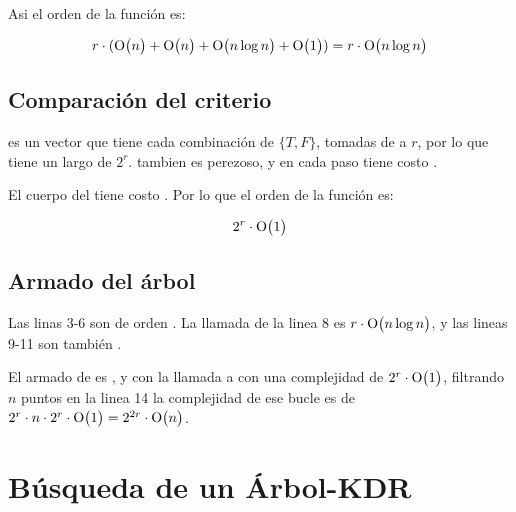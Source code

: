 Asi el orden de la función  es:

\[ r \cdot (\mathrm{O}\bigl(n\bigr)+\mathrm{O}\bigl(n\bigr)+\mathrm{O}\bigl(n \log{n}\bigr) + \mathrm{O}\bigl(1\bigr)) \\
   = r \cdot \mathrm{O}\bigl(n \log{n}\bigr)  \]

\subsection{Comparación del criterio}


 es un vector que tiene cada combinación de \(\{ T, F \}\),
tomadas de a \(r\), por lo que tiene un largo de \(2^r\). 
tambien es perezoso, y en cada paso tiene costo .

El cuerpo del  tiene costo . Por lo que el orden de la función es:

\[ 2^r \cdot \mathrm{O}\bigl(1\bigr) \]


\subsection{Armado del árbol}


Las linas 3-6 son de orden . La llamada de la linea 8 es
\(r \cdot \mathrm{O}\bigl(n \log{n}\bigr)\), y las lineas 9-11 son también .

El armado de  es , y con la llamada
a  con una complejidad de \(2^r \cdot \mathrm{O}\bigl(1\bigr)\),
filtrando \(n\) puntos en la linea 14 la complejidad de ese bucle es de
\( 2^r \cdot n \cdot 2^r \cdot \mathrm{O}\bigl(1\bigr) = 2^{2r} \cdot \mathrm{O}\bigl(n\bigr)\).







\section{Búsqueda de un Árbol-KDR}


